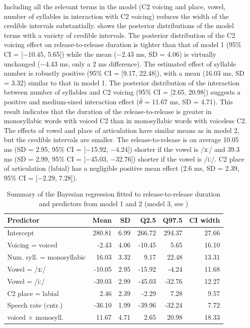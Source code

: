 \documentclass[
  12pt,
  a4paper,
]{article}
\begin{document}
Including all the relevant terms in the model (C2 voicing and place,
vowel, number of syllables in interaction with C2 voicing) reduces the
width of the credible intervals substantially. 
shows the posterior distributions of the model terms with a variety of
credible intervals. The posterior distribution of the C2 voicing effect
on release-to-release duration is tighter than that of model 1 (95\% CI
= {[}−10.45, 5.65{]}) while the mean (−2.43 ms, SD = 4.06) is virtually
unchanged (−4.43 ms, only a 2 ms difference). The estimated effect of
syllable number is robustly positive (95\% CI = {[}9.17, 22.48{]}), with
a mean (16.03 ms, SD = 3.32) similar to that in model 1. The posterior
distribution of the interaction between number of syllables and C2
voicing (95\% CI = {[}2.65, 20.98{]}) suggests a positive and
medium-sized interaction effect (\(\bar{\theta}\) = 11.67 ms, SD =
4.71). This result indicates that the duration of the release-to-release
is greater in monosyllabic words with voiced C2 than in monosyllabic
words with voiceless C2. The effects of vowel and place of articulation
have similar means as in model 2, but the credible intervals are
smaller. The release-to-release is on average 10.05 ms (SD = 2.95, 95\%
CI = {[}−15.92, −4.24{]}) shorter if the vowel is /ɜː/ and 39.3 ms (SD =
2.99, 95\% CI = {[}−45.03, −32.76{]}) shorter if the vowel is /iː/. C2
place of articulation (labial) has a negligible positive mean effect
(2.6 ms, SD = 2.39, 95\% CI = {[}−2.29, 7.28{]}).

\begin{table}[t]

\caption{\label{tab:rr-3-table}Summary of the Bayesian regression fitted to release-to-release duration and predictors from model 1 and 2 (model 3, see )}
\centering
\fontsize{8}{10}\selectfont
\begin{tabular}{lrrrrr}
\toprule
Predictor & Mean & SD & Q2.5 & Q97.5 & CI width\\
\midrule
Intercept & 280.81 & 6.99 & 266.72 & 294.37 & 27.66\\
Voicing = voiced & -2.43 & 4.06 & -10.45 & 5.65 & 16.10\\
Num. syll. = monosyllabic & 16.03 & 3.32 & 9.17 & 22.48 & 13.31\\
Vowel = /ɜː/ & -10.05 & 2.95 & -15.92 & -4.24 & 11.68\\
Vowel = /iː/ & -39.03 & 2.99 & -45.03 & -32.76 & 12.27\\
C2 place = labial & 2.46 & 2.39 & -2.29 & 7.28 & 9.57\\
Speech rate (cntr.) & -36.10 & 1.99 & -39.96 & -32.24 & 7.72\\
voiced × monosyll. & 11.67 & 4.71 & 2.65 & 20.98 & 18.33\\
\bottomrule
\end{tabular}
\end{table}
\end{document}
